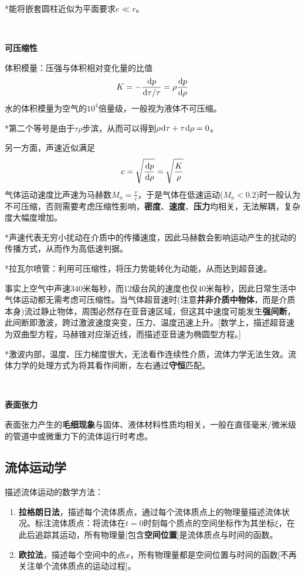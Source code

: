 \documentclass[a4paper,UTF8,fontset=windows]{ctexart}
\newcommand*{\dr}{\hspace{0.07em}\mathrm{d}}
\begin{document}
*能将嵌套圆柱近似为平面要求$e\ll r$。

\

\textbf{可压缩性}

体积模量：压强与体积相对变化量的比值
$$K=-\frac{\dr p}{\dr\tau/\tau}=\rho\frac{\dr p}{\dr\rho}$$
水的体积模量为空气的$10^4$倍量级，一般视为液体不可压缩。

*第二个等号是由于$\tau\rho$步滨，从而可以得到$\rho\dr\tau+\tau\dr\rho=0$。

另一方面，声速近似满足
$$c=\sqrt{\frac{\dr p}{\dr\rho}}=\sqrt{\frac{K}{\rho}}$$
气体运动速度比声速为马赫数$M_a=\frac{v}{c}$，于是气体在低速运动($M_a<0.2$)时一般认为不可压缩，否则需要考虑压缩性影响，\textbf{密度}、\textbf{速度}、\textbf{压力}均相关，无法解耦，复杂度大幅度增加。

*声速代表无穷小扰动在介质中的传播速度，因此马赫数会影响运动产生的扰动的传播方式，从而作为高低速判据。

*拉瓦尔喷管：利用可压缩性，将压力势能转化为动能，从而达到超音速。

事实上空气中声速340米每秒，而12级台风的速度也仅40米每秒，因此日常生活中气体运动都无需考虑可压缩性。当气体超音速时(注意\textbf{并非介质中物体}，而是介质本身)流过静止物体，周围必然存在亚音速区域，但这其中速度可能发生\textbf{强间断}，此间断即激波，跨过激波速度突变，压力、温度迅速上升。[数学上，描述超音速为双曲型方程，马赫锥对应渐近线，而描述亚音速为椭圆型方程。]

*激波内部，温度、压力梯度很大，无法看作连续性介质，流体力学无法生效。流体力学的处理方式为将其看作间断，左右通过\textbf{守恒}匹配。

\

\textbf{表面张力}

表面张力产生的\textbf{毛细现象}与固体、液体材料性质均相关，一般在直径毫米/微米级的管道中或微重力下的流体运行时考虑。

\subsection{流体运动学}
描述流体运动的数学方法：
\begin{enumerate}
    \item \textbf{拉格朗日法}，描述每个流体质点，通过每个流体质点上的物理量描述流体状况。标注流体质点：将流体在$t=0$时刻每个质点的空间坐标作为其坐标$\xi$，在此后追踪其运动，所有物理量[包含\textbf{空间位置}]是流体质点与时间的函数。
    \item \textbf{欧拉法}，描述每个空间中的点$x$，所有物理量都是空间位置与时间的函数[不再关注单个流体质点的运动过程]。
\end{enumerate}
\end{document}
